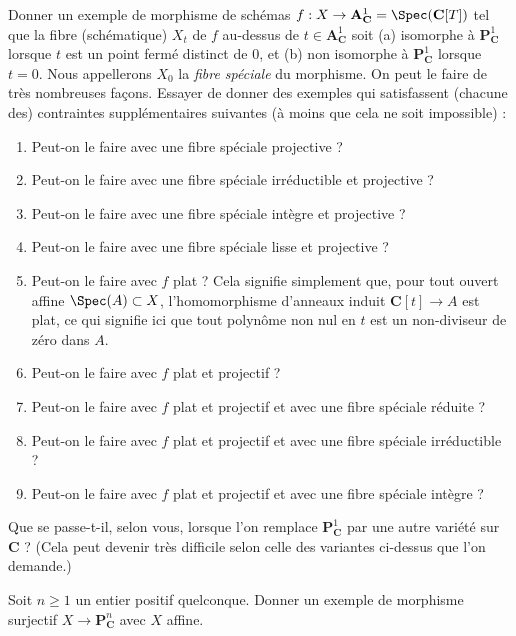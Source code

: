 \begin{exercise}
\label{exercise-family-special-fibre-different}
Donner un exemple de morphisme de schémas
$f : X \to {\mathbf A}^1_{\mathbf C} = \Spec({\mathbf C}[T])$
tel que la fibre (schématique) $X_t$ de $f$ au-dessus de
$t \in {\mathbf A}^1_{\mathbf C}$ soit
(a) isomorphe à ${\mathbf P}^1_{\mathbf C}$ lorsque $t$
est un point fermé distinct de $0$, et
(b) non isomorphe à ${\mathbf P}^1_{\mathbf C}$ lorsque $t = 0$.
Nous appellerons $X_0$ la {\it fibre spéciale} du morphisme.
On peut le faire de très nombreuses façons. Essayer de donner des exemples qui
satisfassent (chacune des) contraintes supplémentaires suivantes (à moins
que cela ne soit impossible) :
\begin{enumerate}
\item Peut-on le faire avec une fibre spéciale projective ?
\item Peut-on le faire avec une fibre spéciale irréductible et projective ?
\item Peut-on le faire avec une fibre spéciale intègre et projective ?
\item Peut-on le faire avec une fibre spéciale lisse et projective ?
\item Peut-on le faire avec $f$ plat ?
Cela signifie simplement que, pour tout ouvert affine $\Spec(A) \subset X$,
l'homomorphisme d'anneaux induit $\mathbf{C}[t] \to A$ est plat, ce qui signifie ici
que tout polynôme non nul en $t$ est un non-diviseur de zéro dans $A$.
\item Peut-on le faire avec $f$ plat et projectif ?
\item Peut-on le faire avec $f$ plat et projectif et avec une fibre spéciale réduite ?
\item Peut-on le faire avec $f$ plat et projectif et avec une fibre spéciale irréductible ?
\item Peut-on le faire avec $f$ plat et projectif et avec une fibre spéciale intègre ?
\end{enumerate}
Que se passe-t-il, selon vous, lorsque l'on remplace
${\mathbf P}^1_{\mathbf C}$ par une autre variété sur ${\mathbf C}$ ?
(Cela peut devenir très difficile selon celle des variantes ci-dessus que l'on
demande.)
\end{exercise}

\begin{exercise}
\label{exercise-affine-onto-projective-space}
Soit $n \geq 1$ un entier positif quelconque.
Donner un exemple de morphisme surjectif
$X \to {\mathbf P}^n_{\mathbf C}$ avec $X$ affine.
\end{exercise}

